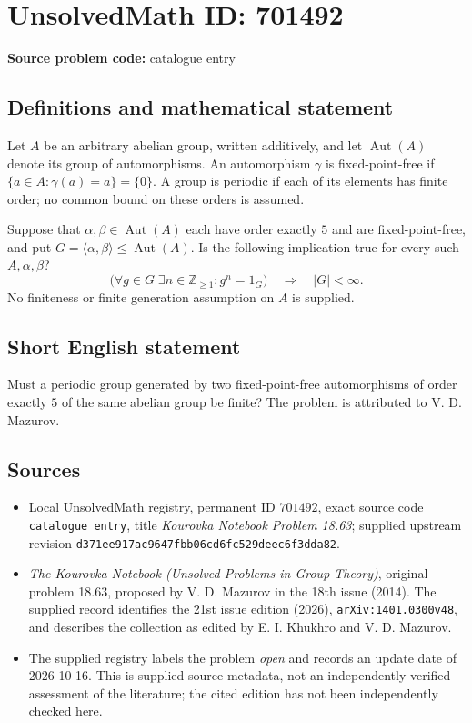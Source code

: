 \documentclass[11pt]{article}
\newcommand{\Z}{\mathbb{Z}}
\begin{document}
\section*{UnsolvedMath ID: 701492}
\textbf{Source problem code:} catalogue entry
\subsection{Definitions and mathematical statement}
Let \(A\) be an arbitrary abelian group, written additively, and let \(\operatorname{Aut}(A)\) denote its group of automorphisms. An automorphism \(\gamma\) is fixed-point-free if \(\{a\in A:\gamma(a)=a\}=\{0\}\). A group is periodic if each of its elements has finite order; no common bound on these orders is assumed.

Suppose that \(\alpha,\beta\in\operatorname{Aut}(A)\) each have order exactly \(5\) and are fixed-point-free, and put \(G=\langle\alpha,\beta\rangle\leq\operatorname{Aut}(A)\). Is the following implication true for every such \(A,\alpha,\beta\)?
\[
\bigl(\forall g\in G\;\exists n\in\Z_{\geq 1}:g^n=1_G\bigr)
\quad\Longrightarrow\quad |G|<\infty.
\]
No finiteness or finite generation assumption on \(A\) is supplied.
\subsection{Short English statement}
Must a periodic group generated by two fixed-point-free automorphisms of order exactly \(5\) of the same abelian group be finite? The problem is attributed to V. D. Mazurov.
\subsection{Sources}
\begin{itemize}
\item Local UnsolvedMath registry, permanent ID \(701492\), exact source code \texttt{catalogue entry}, title \emph{Kourovka Notebook Problem 18.63}; supplied upstream revision \texttt{d371ee917ac9647fbb06cd6fc529deec6f3dda82}.
\item \emph{The Kourovka Notebook (Unsolved Problems in Group Theory)}, original problem 18.63, proposed by V. D. Mazurov in the 18th issue (2014). The supplied record identifies the 21st issue edition (2026), \texttt{arXiv:1401.0300v48}, and describes the collection as edited by E. I. Khukhro and V. D. Mazurov.
\item The supplied registry labels the problem \emph{open} and records an update date of 2026-10-16. This is supplied source metadata, not an independently verified assessment of the literature; the cited edition has not been independently checked here.
\end{itemize}
\end{document}
